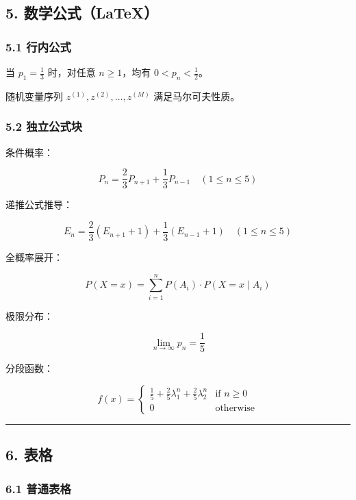 \subsection{5. 数学公式（LaTeX）}\label{ux6570ux5b66ux516cux5f0flatex}

\subsubsection{5.1 行内公式}\label{ux884cux5185ux516cux5f0f}

当 \(p_1 = \frac{1}{3}\) 时，对任意 \(n \ge 1\)，均有
\(0 < p_n < \frac{1}{2}\)。

随机变量序列 \(z^{(1)}, z^{(2)}, \dots, z^{(M)}\) 满足马尔可夫性质。

\subsubsection{5.2 独立公式块}\label{ux72ecux7acbux516cux5f0fux5757}

条件概率：

\[P_n = \frac{2}{3} P_{n+1} + \frac{1}{3} P_{n-1} \quad (1 \le n \le 5)\]

递推公式推导：

\[E_n = \frac{2}{3} (E_{n+1} + 1) + \frac{1}{3} (E_{n-1} + 1) \quad (1 \le n \le 5)\]

全概率展开：

\[P(X = x) = \sum_{i=1}^{n} P(A_i) \cdot P(X = x \mid A_i)\]

极限分布：

\[\lim_{n \to \infty} p_n = \frac{1}{5}\]

分段函数：

\[
f(x) = 
\begin{cases}
\frac{1}{5} + \frac{2}{5}\lambda_1^n + \frac{2}{5}\lambda_2^n & \text{if } n \ge 0 \\
0 & \text{otherwise}
\end{cases}
\]

\begin{center}\rule{0.5\linewidth}{0.5pt}\end{center}

\subsection{6. 表格}\label{ux8868ux683c}

\subsubsection{6.1 普通表格}\label{ux666eux901aux8868ux683c}

